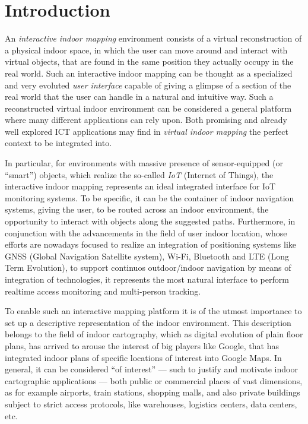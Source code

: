 \section{Introduction}\label{introduction}

An \emph{interactive indoor mapping} environment consists of a virtual reconstruction
of a physical indoor space, in which the user can move around and interact
with virtual objects, that are found in the same position they actually occupy in the
real world. Such an interactive indoor mapping can be thought as a specialized
and very evoluted \emph{user interface} capable of giving a glimpse of a section of
the real world that the user can handle in a natural and intuitive way.  Such
a reconstructed virtual indoor environment can be considered a general
platform where many different applications can rely upon. Both promising and
already well explored ICT applications may find in \emph{virtual indoor mapping} the
perfect context to be integrated into.

In particular, for environments with massive presence of sensor-equipped (or
``smart'') objects, which realize the so-called \emph{IoT} (Internet of
Things), the interactive indoor mapping represents an ideal integrated
interface for IoT monitoring systems. To be specific, it can be the container
of indoor navigation systems, giving the user, to be routed across an indoor
environment, the opportunity to interact with objects along the suggested
paths. Furthermore, in conjunction with the advancements in the field of user
indoor location, whose efforts are nowadays focused to realize an integration
of positioning systems like GNSS (Global Navigation Satellite system), Wi-Fi, Bluetooth and
LTE (Long Term Evolution), to support continuos outdoor/indoor navigation by
means of integration of technologies,
it represents the most natural interface to perform realtime access monitoring
and multi-person tracking.

To enable such an interactive mapping platform it is of the utmost importance to set up  a
descriptive representation of the indoor environment. This description belongs to 
the field of indoor cartography, which as digital evolution of plain floor
plans, has arrived to arouse the interest of big players like Google, that has
integrated indoor plans of specific locations of interest
\cite{indoormaps} into Google Maps. In general, it can be considered ``of interest'' --- such to
justify and motivate indoor cartographic applications --- both public or
commercial places of vast dimensions, as for example airports, train stations,
shopping malls, and also private buildings subject to strict access protocols,
like warehouses, logistics centers, data centers, etc.

